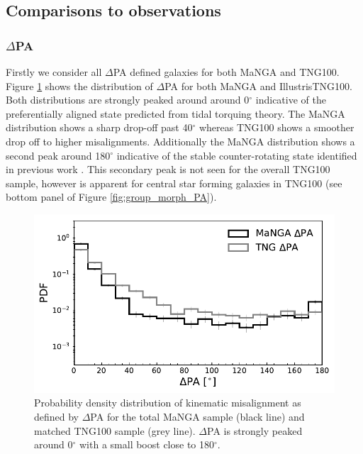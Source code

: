 \subsection{Comparisons to observations} \label{sec:manga_tng_comp}
\subsubsection{$\Delta$PA}
Firstly we consider all $\Delta$PA defined galaxies for both MaNGA and TNG100. Figure \ref{fig:total_pa_dist} shows the distribution of $\Delta$PA for both MaNGA and IllustrisTNG100. Both distributions are strongly peaked around around 0$^{\circ}$ indicative of the preferentially aligned state predicted from tidal torquing theory. The MaNGA distribution shows a sharp drop-off past 40$^{\circ}$ whereas TNG100 shows a smoother drop off to higher misalignments. Additionally the MaNGA distribution shows a second peak around 180$^{\circ}$ indicative of the stable counter-rotating state identified in previous work \citep[e.g.][]{chen2016}. This secondary peak is not seen for the overall TNG100 sample, however is apparent for central star forming galaxies in TNG100 (see bottom panel of Figure \ref{fig:group_morph_PA}). 

\begin{figure}
    \centering
	\includegraphics[width=0.85\linewidth]{misalignment_TNG/mpl8_pa_dist.pdf}
    \caption{Probability density distribution of kinematic misalignment as defined by $\Delta$PA for the total MaNGA sample (black line) and matched TNG100 sample (grey line). $\Delta$PA is strongly peaked around 0$^{\circ}$ with a small boost close to 180$^{\circ}$.}
    \label{fig:total_pa_dist}
\end{figure}

